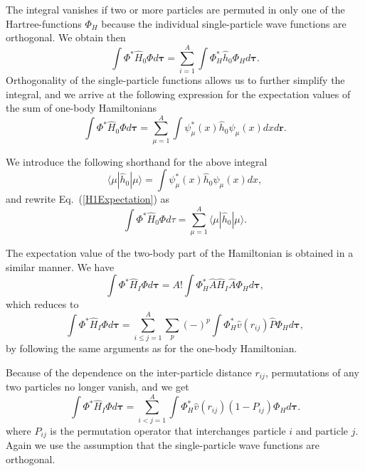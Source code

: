 \documentclass[%
twoside,                 %
final,                   %
10pt]{article}
\begin{document}
The integral vanishes if two or more particles are permuted in only one
of the Hartree-functions $\Phi_H$ because the individual single-particle wave functions are
orthogonal. We obtain then
\[
  \int \Phi^*\hat{H}_0\Phi  d\mathbf{\tau}= \sum_{i=1}^A \int \Phi_H^*\hat{h}_0\Phi_H  d\mathbf{\tau}.
\]
Orthogonality of the single-particle functions allows us to further simplify the integral, and we
arrive at the following expression for the expectation values of the
sum of one-body Hamiltonians 
\begin{equation}
  \int \Phi^*\hat{H}_0\Phi  d\mathbf{\tau}
  = \sum_{\mu=1}^A \int \psi_{\mu}^*(x)\hat{h}_0\psi_{\mu}(x)dx
  d\mathbf{r}.
  \label{H1Expectation}
\end{equation}



We introduce the following shorthand for the above integral
\[
\langle \mu | \hat{h}_0 | \mu \rangle = \int \psi_{\mu}^*(x)\hat{h}_0\psi_{\mu}(x)dx,
\]
and rewrite Eq.~(\ref{H1Expectation}) as
\begin{equation}
  \int \Phi^*\hat{H}_0\Phi  d\tau
  = \sum_{\mu=1}^A \langle \mu | \hat{h}_0 | \mu \rangle.
  \label{H1Expectation1}
\end{equation}



The expectation value of the two-body part of the Hamiltonian is obtained in a
similar manner. We have
\[
  \int \Phi^*\hat{H}_I\Phi d\mathbf{\tau} 
  = A! \int \Phi_H^*\hat{A}\hat{H}_I\hat{A}\Phi_H d\mathbf{\tau},
\]
which reduces to
\[
 \int \Phi^*\hat{H}_I\Phi d\mathbf{\tau} 
  = \sum_{i\le j=1}^A \sum_{p} (-)^p\int 
  \Phi_H^*\hat{v}(r_{ij})\hat{P}\Phi_H d\mathbf{\tau},
\]
by following the same arguments as for the one-body
Hamiltonian. 



Because of the dependence on the inter-particle distance $r_{ij}$,  permutations of
any two particles no longer vanish, and we get
\[
  \int \Phi^*\hat{H}_I\Phi d\mathbf{\tau} 
  = \sum_{i < j=1}^A \int  
  \Phi_H^*\hat{v}(r_{ij})(1-P_{ij})\Phi_H d\mathbf{\tau}.
\]
where $P_{ij}$ is the permutation operator that interchanges
particle $i$ and particle $j$. Again we use the assumption that the single-particle wave functions
are orthogonal. 
\end{document}
